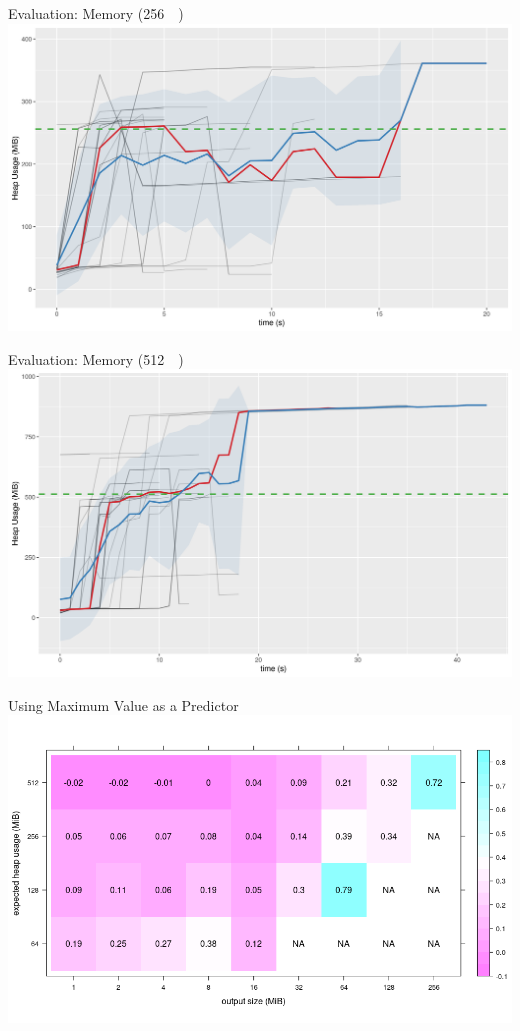 \documentclass{beamer}
\begin{document}
\begin{frame}{Evaluation: Memory (\SI{256}{\mebi\byte})}
  \includegraphics[width=\textwidth]{../../plots/heap_256.png}
\end{frame}

\begin{frame}{Evaluation: Memory (\SI{512}{\mebi\byte})}
  \includegraphics[width=\textwidth]{../../plots/heap_512.png}
\end{frame}

\begin{frame}{Using Maximum Value as a Predictor}
  \includegraphics[width=\textwidth]{../../plots/relative_median_errors.png}
\end{frame}
\end{document}
